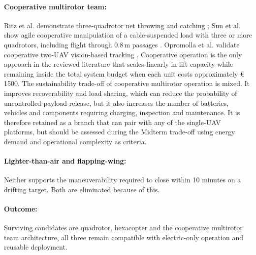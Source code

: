 \paragraph{Cooperative multirotor team:} Ritz et al. demonstrate three-quadrotor net throwing and catching \cite{Ritz2012CooperativeCatching}; Sun et al. show agile cooperative manipulation of a cable-suspended load with three or more quadrotors, including flight through $0.8\,\mathrm{m}$ passages \cite{Sun2025MLoad}. Opromolla et al. validate cooperative two-UAV vision-based tracking \cite{Opromolla2019AirborneLearning}. Cooperative operation is the only approach in the reviewed literature that scales linearly in lift capacity while remaining inside the total system budget when each unit costs approximately \euro\,1500. The sustainability trade-off of cooperative multirotor operation is mixed. It improves recoverability and load sharing, which can reduce the probability of uncontrolled payload release, but it also increases the number of batteries, vehicles and components requiring charging, inspection and maintenance. It is therefore retained as a branch that can pair with any of the single-UAV platforms, but should be assessed during the Midterm trade-off using energy demand and operational complexity as criteria.

\paragraph{Lighter-than-air and flapping-wing:} Neither supports the maneuverability required to close within 10 minutes on a drifting target. Both are eliminated because of this.

\paragraph{Outcome:} Surviving candidates are quadrotor, hexacopter and the cooperative multirotor team architecture, all three remain compatible with electric-only operation and reusable deployment. %

